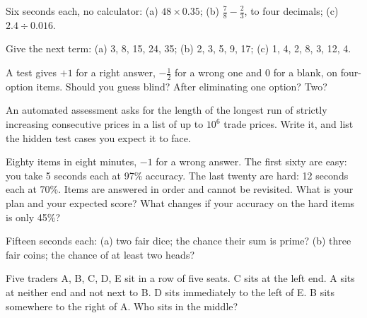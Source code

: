 \begin{interviewq}\label{iq:iv:online-assessments:1}
Six seconds each, no calculator: (a) $48 \times 0.35$; (b) $\tfrac78 - \tfrac23$, to four decimals;
(c) $2.4 \div 0.016$.
\end{interviewq}

\begin{interviewq}\label{iq:iv:online-assessments:2}
Give the next term: (a) 3, 8, 15, 24, 35; (b) 2, 3, 5, 9, 17; (c) 1, 4, 2, 8, 3, 12, 4.
\end{interviewq}

\begin{interviewq}\label{iq:iv:online-assessments:3}
A test gives $+1$ for a right answer, $-\tfrac12$ for a wrong one and 0 for a blank, on four-option items.
Should you guess blind? After eliminating one option? Two?
\end{interviewq}

\begin{interviewq}\label{iq:iv:online-assessments:4}
An automated assessment asks for the length of the longest run of strictly increasing consecutive prices in a
list of up to $10^6$ trade prices. Write it, and list the hidden test cases you expect it to face.
\end{interviewq}

\begin{interviewq}\label{iq:iv:online-assessments:5}
Eighty items in eight minutes, $-1$ for a wrong answer. The first sixty are easy: you take 5 seconds each at
97\% accuracy. The last twenty are hard: 12 seconds each at 70\%. Items are answered in order and cannot be
revisited. What is your plan and your expected score? What changes if your accuracy on the hard items is only
45\%?
\end{interviewq}

\begin{interviewq}\label{iq:iv:online-assessments:6}
Fifteen seconds each: (a) two fair dice; the chance their sum is prime? (b) three fair coins; the chance of
at least two heads?
\end{interviewq}

\begin{interviewq}\label{iq:iv:online-assessments:7}
Five traders A, B, C, D, E sit in a row of five seats. C sits at the left end. A sits at neither end and not
next to B. D sits immediately to the left of E. B sits somewhere to the right of A. Who sits in the middle?
\end{interviewq}

